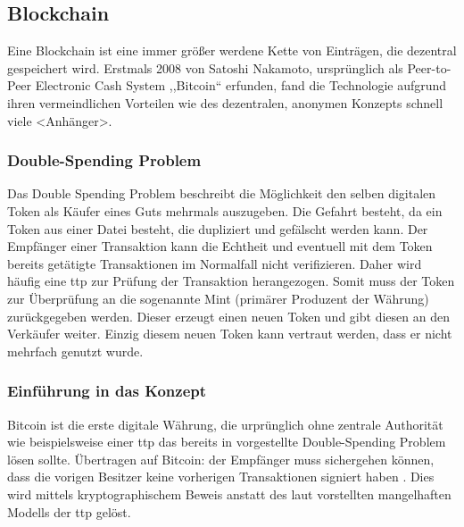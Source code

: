 \subsection{Blockchain}
\label{sec:blockchain}
    Eine Blockchain ist eine immer größer werdene Kette von Einträgen, die dezentral gespeichert wird. 
    Erstmals 2008 von Satoshi Nakamoto, ursprünglich als Peer-to-Peer Electronic Cash System ,,Bitcoin`` erfunden, fand die Technologie aufgrund ihren vermeindlichen Vorteilen wie des dezentralen, anonymen Konzepts schnell viele <Anhänger>. 
    
    \subsubsection{Double-Spending Problem}
    \label{sec:blockchain_doublespend}
    Das Double Spending Problem beschreibt die Möglichkeit den selben digitalen Token als Käufer eines Guts mehrmals auszugeben\cite{Chohan2017}.
    Die Gefahrt besteht, da ein Token aus einer Datei besteht, die dupliziert und gefälscht werden kann\cite{Chohan2017}.
    Der Empfänger einer Transaktion kann die Echtheit und eventuell mit dem Token bereits getätigte Transaktionen im Normalfall nicht verifizieren\cite{Nakamoto2008}.
    Daher wird häufig eine \gls{ttp} zur Prüfung der Transaktion herangezogen.
    Somit muss der Token zur Überprüfung an die sogenannte Mint (primärer Produzent der Währung) zurückgegeben werden. 
    Dieser erzeugt einen neuen Token und gibt diesen an den Verkäufer weiter.
    Einzig diesem neuen Token kann vertraut werden, dass er nicht mehrfach genutzt wurde\cite{Nakamoto2008}.
    
    \subsubsection{Einführung in das Konzept}
    \label{sec:blockchain_introduction}
    Bitcoin ist die erste digitale Währung, die urprünglich ohne zentrale Authorität wie beispielsweise einer \gls{ttp} das bereits in  vorgestellte Double-Spending Problem lösen sollte\cite{Nakamoto2008}. 
    Übertragen auf Bitcoin: der Empfänger muss sichergehen können, dass die vorigen Besitzer keine vorherigen Transaktionen signiert haben \cite{Nakamoto2008}.
    Dies wird mittels kryptographischem Beweis anstatt des laut \citeauthor{Nakamoto2008} vorstellten mangelhaften Modells der \gls{ttp} gelöst.
    
